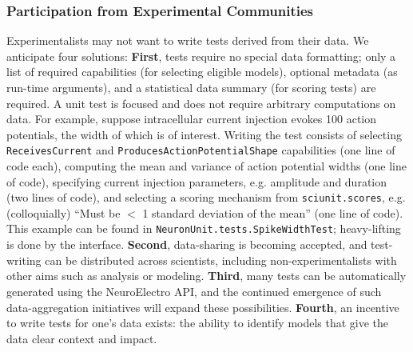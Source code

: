 \documentclass[11pt,letterpaper]{article}
\let\verbx\lstinline
\begin{document}
\subsubsection{Participation from Experimental Communities}
Experimentalists may not want to write tests derived from their data.  We anticipate four solutions: \textbf{First}, tests require no special data formatting; only a list of required  capabilities (for selecting eligible models), optional metadata (as run-time arguments), and a statistical data summary (for scoring tests) are required.  A unit test is focused and does not require arbitrary computations on data.  For example, suppose intracellular current injection evokes 100 action potentials, the width of which is of interest.  Writing the test consists of selecting \verbx{ReceivesCurrent} and \verbx{ProducesActionPotentialShape} capabilities (one line of code each), computing the mean and variance of action potential widths (one line of code), specifying current injection parameters, e.g. amplitude and duration (two lines of code), and selecting a scoring mechanism from \verbx{sciunit.scores}, e.g. (colloquially) ``Must be $<$ 1 standard deviation of the mean'' (one line of code).  This example can be found in \verbx{NeuronUnit.tests.SpikeWidthTest}; heavy-lifting is done by the interface.
\textbf{Second}, data-sharing is becoming accepted, and test-writing can be distributed across scientists, including non-experimentalists with other aims such as analysis or modeling. 
\textbf{Third}, many tests can be automatically generated using the NeuroElectro API, and the continued emergence of such data-aggregation initiatives will expand these possibilities. \textbf{Fourth}, an incentive to write tests for one's data exists: the ability to identify models that give the data clear context and impact. 
\end{document}
